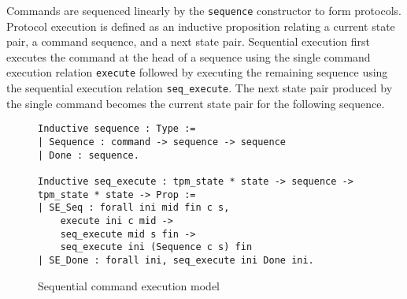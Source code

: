\documentclass[runningheads]{llncs}
\begin{document}



Commands are sequenced linearly by the \verb|sequence| constructor to form
protocols. Protocol execution is defined as an inductive proposition
relating a current state pair, a command sequence, and a next state
pair. Sequential execution first executes the command at the head of a
sequence using the single command execution relation \verb|execute|
followed by executing the remaining sequence using the sequential
execution relation \verb|seq_execute|. The next state pair produced by
the single command becomes the current state pair for the following
sequence.

\begin{figure}[hbtp]
\begin{lstlisting}[language=Coq]
Inductive sequence : Type :=
| Sequence : command -> sequence -> sequence
| Done : sequence.

Inductive seq_execute : tpm_state * state -> sequence -> tpm_state * state -> Prop :=
| SE_Seq : forall ini mid fin c s,
    execute ini c mid ->
    seq_execute mid s fin ->
    seq_execute ini (Sequence c s) fin
| SE_Done : forall ini, seq_execute ini Done ini.
\end{lstlisting}
\caption{Sequential command execution model}
\label{fig:command-sequence-model}
\end{figure}
\end{document}
